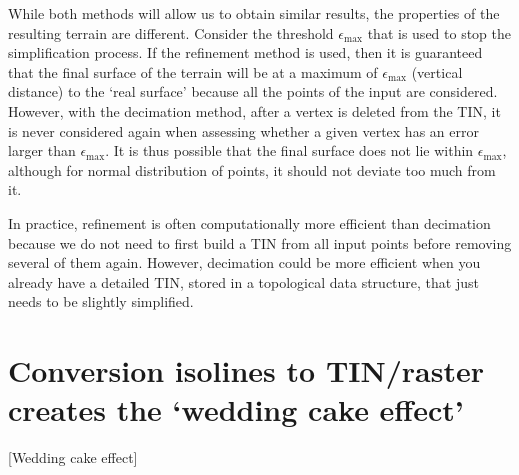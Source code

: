 %

While both methods will allow us to obtain similar results, the properties of the resulting terrain are different.
Consider the threshold $\epsilon_{\max}$ that is used to stop the simplification process.
If the refinement method is used, then it is guaranteed that the final surface of the terrain will be at a maximum of $\epsilon_{\max}$ (vertical distance) to the `real surface' because all the points of the input are considered.
However, with the decimation method, after a vertex is deleted from the TIN, it is never considered again when assessing whether a given vertex has an error larger than $\epsilon_{\max}$. 
It is thus possible that the final surface does not lie within $\epsilon_{\max}$, although for normal distribution of points, it should not deviate too much from it.

%

In practice, refinement is often computationally more efficient than decimation because we do not need to first build a TIN from all input points before removing several of them again. 
However, decimation could be more efficient when you already have a detailed TIN, stored in a topological data structure, that just needs to be slightly simplified.

%
\section[Wedding cake effect]{Conversion isolines to TIN/raster creates the `wedding cake effect'}[Wedding cake effect]%
\label{sec:weddingcake}

